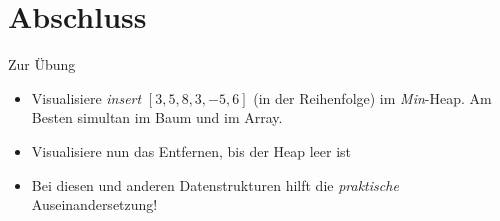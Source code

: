 \section{Abschluss}
\begin{frame}{Zur Übung}
    \begin{itemize}[<+(1)->]
        \itemsep7pt
        \item Visualisiere \textit{insert} \([3, 5, 8, 3, -5, 6]\) (in der Reihenfolge) im \textit{Min}-Heap. Am Besten simultan im Baum und im Array.
        \item Visualisiere nun das Entfernen, bis der Heap leer ist\bigskip
        \item[\scalebox{.5}{\raisebox{3.66pt}{\paletteA{$\blacksquare$}}}] Bei diesen und anderen Datenstrukturen hilft die \textit{praktische} Auseinandersetzung!
    \end{itemize}
\end{frame}
\SidebarReset

